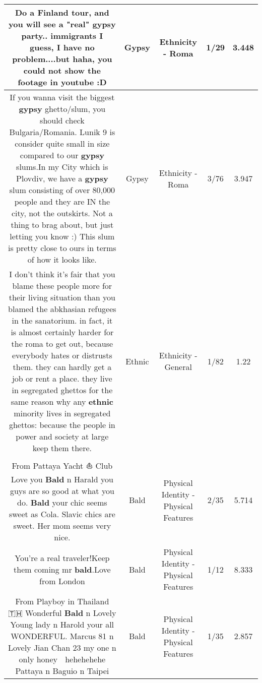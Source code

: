 \documentclass[11pt]{article}
\newlength\mylength
\begin{document}
\begin{center}
\begin{longtable}{|C{.65\mylength}|C{.30\mylength}|C{.12\mylength}|C{.12\mylength}|C{.12\mylength}|}
  \small Do a Finland tour, and you will see a "real" \textbf{gypsy} party.. immigrants I guess, I have no problem....but haha, you could not show the footage in youtube :D\normalsize   & Gypsy & Ethnicity - Roma & 1/29 & 3.448 \\  \hline
  \small If you wanna visit the biggest \textbf{gypsy} ghetto/slum, you should check Bulgaria/Romania. Lunik 9 is consider quite small in size compared to our \textbf{gypsy} slums.In my City which is Plovdiv, we have a \textbf{gypsy} slum consisting of over 80,000 people and they are IN the city, not the outskirts. Not a thing to brag about, but just letting you know :) This slum is pretty close to ours in terms of how it looks like.\normalsize   & Gypsy & Ethnicity - Roma & 3/76 & 3.947 \\  \hline
  \small I don't think it's fair that you blame these people more for their living situation than you blamed the abkhasian refugees in the sanatorium. in fact, it is almost certainly harder for the roma to get out, because everybody hates or distrusts them. they can hardly get a job or rent a place. they live in segregated ghettos for the same reason why any \textbf{ethnic} minority lives in segregated ghettos: because the people in power and society at large keep them there.\normalsize   & Ethnic & Ethnicity - General & 1/82 & 1.22 \\  \hline
  \small From Pattaya Yacht ⛵ Club  Love you \textbf{Bald} n Harald you guys are so good at what you do. \textbf{Bald} your chic seems sweet as Cola. Slavic chics are sweet. Her mom seems very nice.\normalsize   & Bald & Physical Identity - Physical Features & 2/35 & 5.714 \\  \hline
  \small You're a real traveler!Keep them coming mr \textbf{bald}.Love from London\normalsize   & Bald & Physical Identity - Physical Features & 1/12 & 8.333 \\  \hline
  \small From Playboy in Thailand 🇹🇭 Wonderful \textbf{Bald} n Lovely Young lady n Harold your all WONDERFUL. Marcus 81 n Lovely Jian Chan 23 my one n only honey 🍯 hehehehehe Pattaya n Baguio n Taipei\normalsize   & Bald & Physical Identity - Physical Features & 1/35 & 2.857 \\  \hline

\end{longtable}
\end{center}
\end{document}
